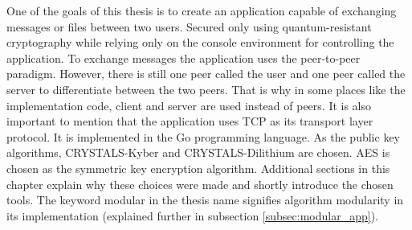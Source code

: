 One of the goals of this thesis is to create an application capable of exchanging messages or files between two users. Secured only using quantum-resistant cryptography while relying only on the console environment for controlling the application. To exchange messages the application uses the peer-to-peer paradigm. However, there is still one peer called the user and one peer called the server to differentiate between the two peers. That is why in some places like the implementation code, client and server are used instead of peers. It is also important to mention that the application uses TCP as its transport layer protocol. It is implemented in the Go programming language. As the public key algorithms, CRYSTALS-Kyber and CRYSTALS-Dilithium are chosen. AES is chosen as the symmetric key encryption algorithm. Additional sections in this chapter explain why these choices were made and shortly introduce the chosen tools. The keyword modular in the thesis name signifies algorithm modularity in its implementation (explained further in subsection \ref{subsec:modular_app}).
